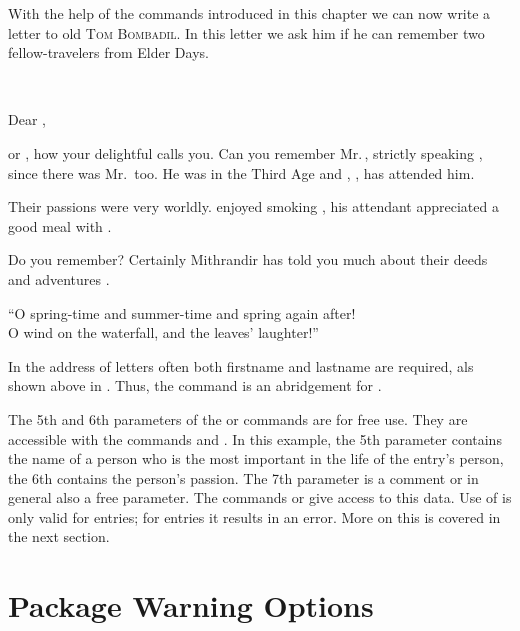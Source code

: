 With the help of the commands introduced in this chapter we can now
write a letter to old \textsc{Tom Bombadil}.  In this letter we ask
him if he can remember two fellow-travelers from Elder Days.
\begin{lstcode}[belowskip=\dp\strutbox]
  \begin{letter}{\\}
     \opening{Dear  ,}
     
     or , how your delightful  calls you.  Can
     you remember Mr.\,, strictly speaking
     , since there was Mr.\, too.  He was
      in the Third Age and  ,
     , has attended him.
      
      Their passions were very worldly.   enjoyed
      smoking , his attendant appreciated a good meal with
      .

      Do you remember? Certainly Mithrandir has told you much
      about their deeds and adventures .
    \closing{``O spring-time and summer-time
                and spring again after!\\
               O wind on the waterfall,
                and the leaves' laughter!''}
  \end{letter}
\end{lstcode}
In the address of letters often both firstname and lastname are required, als
shown above in .  Thus, the command
 is an abridgement for
 .

The 5th and 6th parameters of the  or 
commands are for free use.  They are accessible with the commands
 and .  In this example, the 5th parameter contains
the name of a person who is the most important in the life of the entry's
person, the 6th contains the person's passion.  The 7th parameter is a comment
or in general also a free parameter. The commands  or
 give access to this data. Use of  is only valid
for  entries; for  entries it results in an
error. More on this is covered in the next section.


\section{Package Warning Options}

